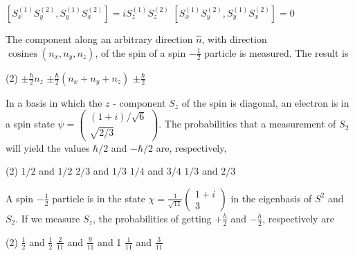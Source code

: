 \begin{enumerate}
\begin{tasks}
	\task[\textbf{C.}]$\left[S_{x}^{(1)} S_{y}^{(2)}, S_{y}^{(1)} S_{x}^{(2)}\right]=i S_{z}^{(1)} S_{z}^{(2)}$
	\task[\textbf{D.}] $\left[S_{x}^{(1)} S_{y}^{(2)}, S_{y}^{(1)} S_{x}^{(2)}\right]=0$
\end{tasks}
\begin{minipage}{\textwidth}
	\item The component along an arbitrary direction $\hat{n}$, with direction $\operatorname{cosines}\left(n_{x}, n_{y}, n_{z}\right)$, of the spin of a spin $-\frac{1}{2}$ particle is measured. The result is
\end{minipage}
\begin{tasks}(2)
	\task[\textbf{B.}]$\pm \frac{\hbar}{2} n_{z}$
	\task[\textbf{C.}]$\pm \frac{\hbar}{2}\left(n_{x}+n_{y}+n_{z}\right)$
	\task[\textbf{D.}]$\pm \frac{\hbar}{2}$
\end{tasks}
\begin{minipage}{\textwidth}
	\item In a basis in which the $z$ - component $S_{z}$ of the spin is diagonal, an electron is in a spin state $\psi=\left(\begin{array}{c}(1+i) / \sqrt{6} \\ \sqrt{2 / 3}\end{array}\right) .$ The probabilities that a measurement of $S_{2}$ will yield the values $\hbar / 2$ and $-\hbar / 2$ are, respectively,
\end{minipage}
\begin{tasks}(2)
	\task[\textbf{A.}] $1 / 2$ and $1 / 2$
	\task[\textbf{B.}]$2 / 3$ and $1 / 3$
	\task[\textbf{C.}]$1 / 4$ and $3 / 4$
	\task[\textbf{D.}]$1 / 3$ and $2 / 3$
\end{tasks}
\begin{minipage}{\textwidth}
	\item A spin $-\frac{1}{2}$ particle is in the state $\chi=\frac{1}{\sqrt{11}}\left(\begin{array}{c}1+i \\ 3\end{array}\right)$ in the eigenbasis of $S^{2}$ and $S_{2}$. If we measure $S_{z}$, the probabilities of getting $+\frac{h}{2}$ and $-\frac{h}{2}$, respectively are
\end{minipage}
\begin{tasks}(2)
	\task[\textbf{A.}] $\frac{1}{2}$ and $\frac{1}{2}$
	\task[\textbf{B.}]$\frac{2}{11}$ and $\frac{9}{11}$
	 and 1
	\task[\textbf{D.}]$\frac{1}{11}$ and $\frac{3}{11}$

\end{tasks}
\end{enumerate}
